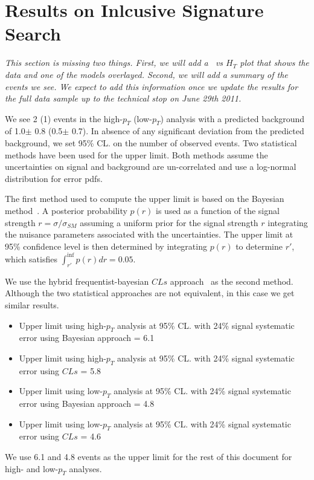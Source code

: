 \section{Results on Inlcusive Signature Search}
\label{sec:inclresults}

{\it This section is missing two things. First, we will add a \met\ vs $H_T$ plot that shows the data and
one of the models overlayed. Second, we will add a summary of the events we see. 
We expect to add this information once we update the results for the full data sample up to the technical stop
on June 29th 2011.}

We see 2 (1) events in the high-$p_T$ (low-$p_T$) analysis with a predicted background of
1.0$\pm$ 0.8 (0.5$\pm$ 0.7).
In absence of any significant deviation from the predicted background, we set 95\% CL. on the number of observed events. 
Two statistical methods have been used for the upper limit. 
Both methods assume the uncertainties on signal and background are un-correlated and use a log-normal distribution for error pdfs. 

The first method used to compute the upper limit is based on the Bayesian method~\cite{bayesian}.
A posterior probability $p(r)$ is used as a function of the signal strength $r = \sigma/\sigma_{SM}$ 
assuming a uniform prior for the signal strength $r$ integrating the nuisance parameters associated with the uncertainties.
The upper limit at 95\% confidence level is then determined by integrating $p(r)$ to determine $r'$, 
which satisfies $\int_{r'}^{\inf} p(r) dr = 0.05$.

We use the hybrid frequentist-bayesian $CLs$ approach~\cite{CLSxx} as the second method. 
Although the two statistical approaches are not equivalent, in this case we get similar results. 

\begin{itemize}
\item Upper limit using high-$p_T$ analysis at 95\% CL. with 24\% signal systematic error using Bayesian approach = 6.1  
\item Upper limit using high-$p_T$ analysis at 95\% CL. with 24\% signal systematic error using $CLs$ = 5.8  
\item Upper limit using low-$p_T$ analysis at 95\% CL. with 24\% signal systematic error using Bayesian approach = 4.8  
\item Upper limit using low-$p_T$ analysis at 95\% CL. with 24\% signal systematic error using $CLs$ = 4.6  
\end{itemize}

We use 6.1 and 4.8 events as the upper limit for the rest of this document for high- and low-$p_T$ analyses.
